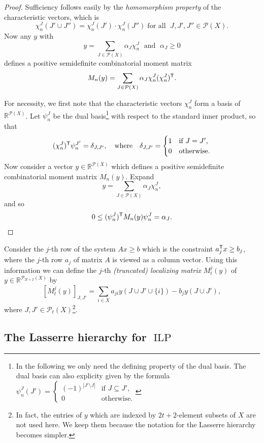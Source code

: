 \documentclass{amsart}
\newcommand{\R}{\mathbb{R}}
\DeclareMathOperator{\ILP}{ILP}
\begin{document}
\begin{proof}
Sufficiency follows easily by the \emph{homomorphism property} of the
characteristic vectors, which is
\[
  \chi^J_n(J' \cup J'') =   \chi^J_n(J')  \cdot  \chi^J_n( J'') \; \text{
    for all } \; J, J', J'' \in \mathcal{P}(X).
\]
Now any $y$ with
\[
  y  = \sum_{J \in \mathcal{P}(X)} \alpha_J \chi^J_n \; \text{ and } \;
  \alpha_J \geq 0
\]
defines a positive semidefinite combinatorial moment matrix
\[
M_n(y) = \sum_{J \in \mathcal{P}(X)} \alpha_J \chi^J_n (\chi^J_n)^{\sf T}.
\]

For necessity, we first note that the characteristic vectors
$\chi^J_n$ form a basis of $\mathbb{R}^{\mathcal{P}(X)}$. Let
$\psi_n^J$ be the dual basis\footnote{In the following we only need the defining property of the dual basis. The dual basis can also explicity given by the formula $\psi^{J}_n(J') =
\begin{cases}
  (-1)^{|J' \setminus J|} & \text{if $J \subseteq J'$,}\\
  0 & \text{otherwise.}
\end{cases}
$} with respect to the standard inner
product, so that
\[
  (\chi^J_n)^{\sf T} \psi^{J'}_n = \delta_{J,J'}, \quad \text{where}
  \quad 
  \delta_{J,J'} = 
  \begin{cases} 
    1 & \text{if $J=J'$,} \\ 
    0 & \text{otherwise.}
\end{cases}
\]
Now consider a vector $y \in \R^{\mathcal{P}(X)}$ which defines a
positive semidefinite combinatorial moment matrix $M_n(y)$. Expand
  \[
    y = \sum_{J \in \mathcal{P}(X)} \alpha_J \chi^J_n,
  \]
 and so
    \[
      0 \leq (\psi^J_n)^{\sf T} M_n(y) \psi^J_n = \alpha_J. \qedhere
 \]
\end{proof}

%

Consider the $j$-th row of the system $Ax \geq b$ which is the
constraint $a_j^{\sf T} x \geq b_j$, where the $j$-th row $a_j$ of
matrix $A$ is viewed as a column vector. Using this information we can
define the $j$-th \emph{(truncated) localizing matrix} $M^j_{t}(y)$ of
$y \in \R^{\mathcal{P}_{2t+2}(X)}$ by
\[
  [M^j_{t}(y)]_{J,J'} = \sum_{i \in X} a_{ji} y(J \cup J' \cup \{i\}) - b_j y(J \cup J'),
\]
where $J, J' \in \mathcal{P}_t(X)$\footnote{In fact, the entries of
  $y$ which are indexed by $2t+2$-element subsets of $X$ are not used
  here. We keep them because the notation for the Lasserre hierarchy
  becomes simpler.}.

\subsection{The Lasserre hierarchy for $\ILP$}
\end{document}
